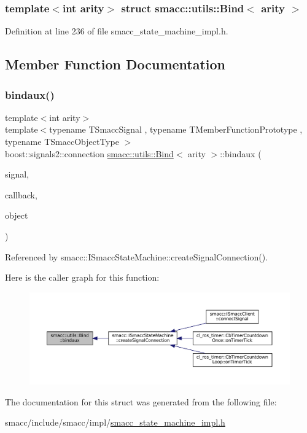 \subsubsection*{template$<$int arity$>$\newline
struct smacc\+::utils\+::\+Bind$<$ arity $>$}



Definition at line 236 of file smacc\+\_\+state\+\_\+machine\+\_\+impl.\+h.



\subsection{Member Function Documentation}
\mbox{\label{structsmacc_1_1utils_1_1Bind_aa0f4ba76fbd5fdb865df51b61d4269f3}} 
\subsubsection{\texorpdfstring{bindaux()}{bindaux()}}
{\footnotesize\ttfamily template$<$int arity$>$ \\
template$<$typename T\+Smacc\+Signal , typename T\+Member\+Function\+Prototype , typename T\+Smacc\+Object\+Type $>$ \\
boost\+::signals2\+::connection \hyperlink{structsmacc_1_1utils_1_1Bind}{smacc\+::utils\+::\+Bind}$<$ arity $>$\+::bindaux (\begin{DoxyParamCaption}\item[{T\+Smacc\+Signal \&}]{signal,  }\item[{T\+Member\+Function\+Prototype}]{callback,  }\item[{T\+Smacc\+Object\+Type $\ast$}]{object }\end{DoxyParamCaption})}



Referenced by smacc\+::\+I\+Smacc\+State\+Machine\+::create\+Signal\+Connection().

Here is the caller graph for this function\+:
\nopagebreak
\begin{figure}[H]
\begin{center}
\leavevmode
\includegraphics[width=350pt]{structsmacc_1_1utils_1_1Bind_aa0f4ba76fbd5fdb865df51b61d4269f3_icgraph}
\end{center}
\end{figure}


The documentation for this struct was generated from the following file\+:\begin{DoxyCompactItemize}
\item 
smacc/include/smacc/impl/\hyperlink{smacc__state__machine__impl_8h}{smacc\+\_\+state\+\_\+machine\+\_\+impl.\+h}\end{DoxyCompactItemize}
